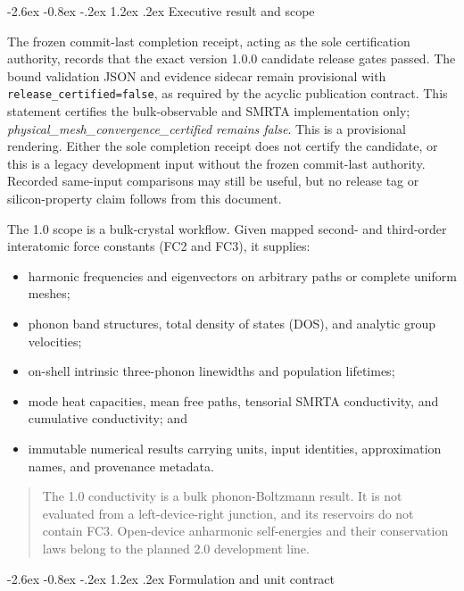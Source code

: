 \documentclass[11pt,a4paper]{article}
\makeatletter
\renewcommand\section{\@startsection{section}{1}{\z@}%
  {-2.6ex \@plus -0.8ex \@minus -.2ex}%
  {1.2ex \@plus .2ex}%
  {\normalfont\Large\sffamily\bfseries\color{ink}}}
\newcommand{\code}[1]{\texttt{#1}}
\newcommand{\scopewarning}[1]{%
  \begin{quote}\small\color{muted}\sffamily #1\end{quote}%
}
\makeatother
\begin{document}
\hypersetup{pageanchor=true}
\tableofcontents
\clearpage
{}

\section{Executive result and scope}

\ifreportcertified
The frozen commit-last completion receipt, acting as the sole certification
authority, records that the exact version 1.0.0 candidate release gates passed.
The bound validation JSON and evidence sidecar remain provisional with
\code{release\_certified=false}, as required by the acyclic publication
contract. This statement certifies the bulk-observable and SMRTA implementation
only; \emph{physical\_mesh\_convergence\_certified remains false}.
\else
This is a provisional rendering. Either the sole completion receipt does not
certify the candidate, or this is a legacy development input without the frozen
commit-last authority. Recorded same-input comparisons may still be useful,
but no release tag or silicon-property claim follows from this document.
\fi

The 1.0 scope is a bulk-crystal workflow. Given mapped second- and third-order
interatomic force constants (FC2 and FC3), it supplies:

\begin{itemize}
  \item harmonic frequencies and eigenvectors on arbitrary paths or complete
  uniform meshes;
  \item phonon band structures, total density of states (DOS), and analytic
  group velocities;
  \item on-shell intrinsic three-phonon linewidths and population lifetimes;
  \item mode heat capacities, mean free paths, tensorial SMRTA conductivity,
  and cumulative conductivity; and
  \item immutable numerical results carrying units, input identities,
  approximation names, and provenance metadata.
\end{itemize}

\scopewarning{The 1.0 conductivity is a bulk phonon-Boltzmann result. It is
not evaluated from a left-device-right junction, and its reservoirs do not
contain FC3. Open-device anharmonic self-energies and their conservation laws
belong to the planned 2.0 development line.}

\section{Formulation and unit contract}
\end{document}
